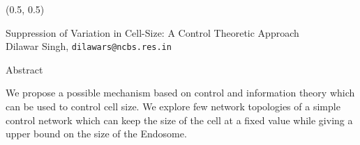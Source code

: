 \documentclass{beamer}
\begin{document}
\begin{textblock}{15}(0.5, 0.5)
    \begin{block}{}
        \centering
        \Large Suppression of Variation in Cell-Size: A Control Theoretic Approach \\
        \large Dilawar Singh, \texttt{dilawars@ncbs.res.in}
    \end{block}
    \begin{block}{Abstract}

        We propose a  possible mechanism based on control and information theory
        which can be used to control cell size. We explore few network
        topologies of a simple control network which can keep the size of the
        cell at a fixed value while giving a upper bound on the size of the
        Endosome.

\end{block}
\end{textblock}
\end{document}
